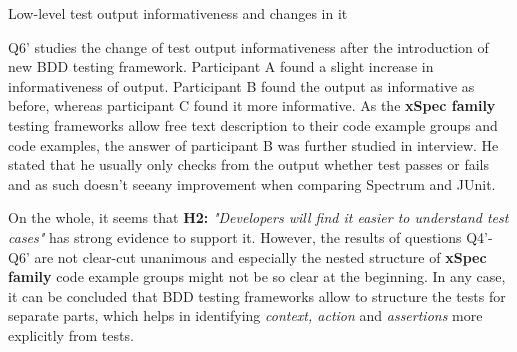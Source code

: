     \begin{table}[H]
            \caption {Low-level test output informativeness and changes in it} \label{tab:changes-pt5}
    \end{table}

Q6' studies the change of test output informativeness after the introduction of new BDD testing framework. Participant A
found a slight increase in informativeness of output. Participant B found the output as informative as before, whereas participant
C found it more informative. As the \textbf{xSpec family} testing frameworks allow free text description to their
code example groups and code examples, the answer of participant B was further studied in interview. He stated that
he usually only checks from the output whether test passes or fails and as such doesn't see\noindent any improvement when
comparing Spectrum and JUnit.

On the whole, it seems that \textbf{H2:} \textit{"Developers will find it easier to understand test cases"} has strong
evidence to support it. However, the results of questions Q4'-Q6' are not clear-cut unanimous and especially the nested structure of \textbf{xSpec family}
code example groups might not be so clear at the beginning. In any case, it can be concluded that BDD testing
frameworks allow to structure the tests for separate parts, which helps in identifying \textit{context, action}
and \textit{assertions} more explicitly from tests.

